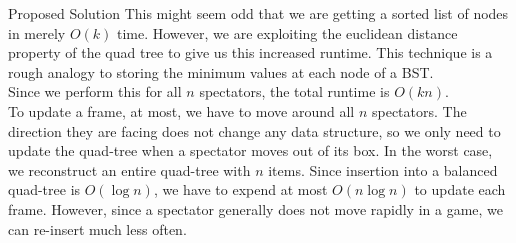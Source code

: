 \documentclass[11pt]{article}
\begin{document}
\begin{section}{Proposed Solution}
This might seem odd that we are getting a sorted list of nodes in merely $O(k)$ time. However, we are exploiting the euclidean distance property of the quad tree to give us this increased runtime. This technique is a rough analogy to storing the minimum values at each node of a BST.\\

Since we perform this for all $n$ spectators, the total runtime is $O(k n)$.\\
 
To update a frame, at most, we have to move around all $n$ spectators. The direction they are facing does not change any data structure, so we only need to update the quad-tree when a spectator moves out of its box. In the worst case, we reconstruct an entire quad-tree with $n$ items. Since insertion into a balanced quad-tree is $O(\log n)$, we have to expend at most $O(n\log n)$ to update each frame. However, since a spectator generally does not move rapidly in a game, we can re-insert much less often.\

\end{section}
\end{document}
